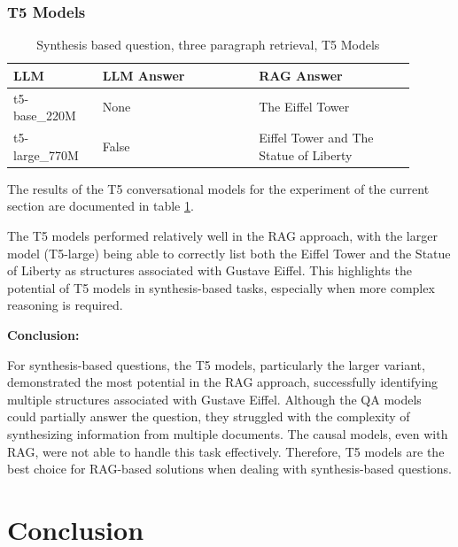 \documentclass{wseas}
\begin{document}
\subsubsection{T5 Models}

\begin{table}[htbp]
  \centering
  \label{tab:experiment_R_3_paragraph_Q_synthesis_M_T5Models_table}  %
  \caption{Synthesis based question, three paragraph retrieval, T5 Models} %
  \begin{tabular}{|p{0.20\linewidth}|p{0.35\linewidth}|p{0.35\linewidth}|}
    \hline
    \textbf{LLM} & \textbf{LLM Answer} & \textbf{RAG Answer} \\
    \hline
    t5-base\_220M & None & The Eiffel Tower \\
    \hline
    t5-large\_770M & False & Eiffel Tower and The Statue of Liberty \\
    \hline
  \end{tabular}
\end{table}

The results of the T5 conversational models for the experiment of the current section
are documented in table \ref{tab:experiment_R_3_paragraph_Q_synthesis_M_T5Models_table}.

The T5 models performed relatively well in the RAG approach, with the
larger model (T5-large) being able to correctly list both the Eiffel
Tower and the Statue of Liberty as structures associated with Gustave
Eiffel. This highlights the potential of T5 models in synthesis-based
tasks, especially when more complex reasoning is required.

\textbf{Conclusion:}

For synthesis-based questions, the T5 models, particularly the larger
variant, demonstrated the most potential in the RAG approach,
successfully identifying multiple structures associated with Gustave
Eiffel. Although the QA models could partially answer the question, they
struggled with the complexity of synthesizing information from multiple
documents. The causal models, even with RAG, were not able to handle
this task effectively. Therefore, T5 models are the best choice for
RAG-based solutions when dealing with synthesis-based questions.


\section{Conclusion}
\end{document}
